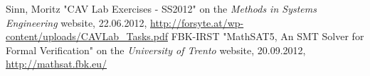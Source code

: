 \documentclass[english,a4paper,oneside]{article}%
\begin{document}
\newpage
\begin{thebibliography}{}
	 Sinn, Moritz "CAV Lab Exercises - SS2012" on the \emph{Methods in Systems Engineering} website, 22.06.2012, \url{http://forsyte.at/wp-content/uploads/CAVLab_Tasks.pdf}
	 FBK-IRST "MathSAT5, An SMT Solver for Formal Verification" on the \emph{University of Trento} website, 20.09.2012, \url{http://mathsat.fbk.eu/}
	
\end{thebibliography} 
\end{document}
